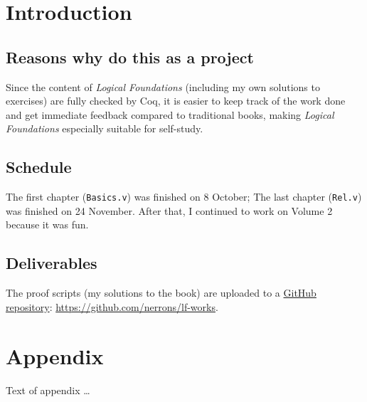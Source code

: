 \documentclass[sigplan]{acmart}\settopmatter{printfolios=true,printccs=false,printacmref=false}
\begin{document}
\section{Introduction}

\subsection[]{Reasons why do this as a project}

Since the content of \emph{Logical Foundations} (including my own solutions to exercises) are fully checked
by Coq, it is easier to keep track of the work done and get immediate feedback compared to
traditional books, making \emph{Logical Foundations} especially suitable for self-study.

\subsection{Schedule}
The first chapter (\texttt{Basics.v}) was finished on 8 October; The last chapter (\texttt{Rel.v}) 
was finished on 24 November. After that, I continued to work on Volume 2 because it was fun.

\subsection{Deliverables}
The proof scripts (my solutions to the book) are uploaded to a
\href{https://github.com/nerrons/lf-works}{GitHub repository}: \url{https://github.com/nerrons/lf-works}.





%


\appendix
\section{Appendix}

Text of appendix \ldots
\end{document}
